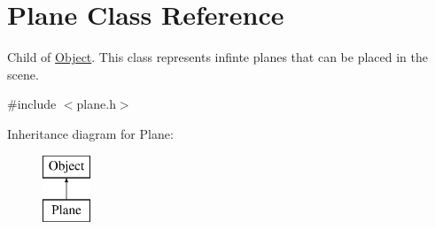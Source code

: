 \hypertarget{class_plane}{}\section{Plane Class Reference}
\label{class_plane}


Child of \mbox{\hyperlink{class_object}{Object}}. This class represents infinte planes that can be placed in the scene.  




{\ttfamily \#include $<$plane.\+h$>$}

Inheritance diagram for Plane\+:\begin{figure}[H]
\begin{center}
\leavevmode
\includegraphics[height=2.000000cm]{class_plane}
\end{center}
\end{figure}
